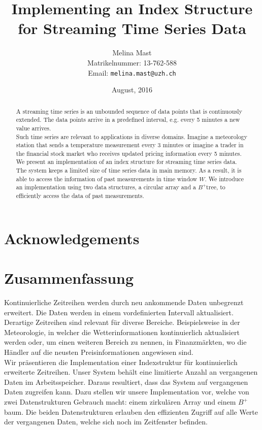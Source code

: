 \documentclass[abstracton,12pt]{scrreprt}
\title{Implementing an Index Structure for Streaming Time Series Data}
\author{
  Melina Mast\\[-5pt]
  \scriptsize Matrikelnummer: 13-762-588\\[-5pt]
  \scriptsize Email: \texttt{melina.mast@uzh.ch}
}
\date{\vspace*{2cm}August, 2016}
\begin{document}
\maketitle

\chapter*{Acknowledgements}



\begin{abstract}
A streaming time series is an unbounded sequence of data points that is continuously extended. The data points arrive in a predefined interval, e.g. every 5 minutes a new value arrives. \\Such time series are relevant to applications in diverse domains. Imagine a meteorology station that sends a temperature measurement every 3 minutes or imagine a trader in the financial stock market who receives updated pricing information every 5 minutes.\\
We present an implementation of an index structure for streaming time series data. The system keeps a limited size of time series data in main memory. As a result, it is able to access the information of past measurements in time window $W$. We introduce an implementation using two data structures, a circular array and a $B^+$tree, to efficiently access the data of past measurements. 

\end{abstract}

\chapter*{Zusammenfassung}
Kontinuierliche Zeitreihen werden durch neu ankommende Daten unbegrenzt erweitert. Die Daten werden in einem vordefinierten Intervall aktualisiert.\\
Derartige Zeitreihen sind relevant für diverse Bereiche. Beispielsweise in der Meteorologie, in welcher die Wetterinformationen kontinuierlich aktualisiert werden oder, um einen weiteren Bereich zu nennen, in Finanzmärkten, wo die Händler auf die neusten Preisinformationen angewiesen sind.\\
Wir präsentieren die Implementation einer Indexstruktur für kontinuierlich erweiterte Zeitreihen. Unser System behält eine limitierte Anzahl an vergangenen Daten im Arbeitsspeicher. Daraus resultiert, dass das System auf vergangenen Daten zugreifen kann. Dazu stellen wir unsere Implementation vor, welche von zwei Datenstrukturen Gebrauch macht: einem zirkulären Array und einem $B^+$baum. Die beiden Datenstrukturen erlauben den effizienten Zugriff auf alle Werte der vergangenen Daten, welche sich noch im Zeitfenster befinden.
\end{document}
